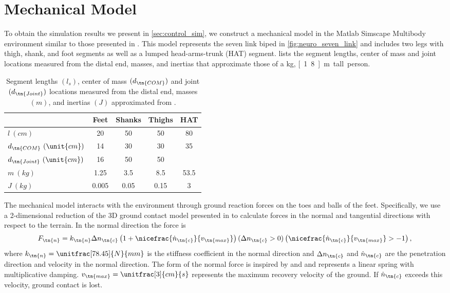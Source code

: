 \section{Mechanical Model}\label{sec:neuro_mech_model}

To obtain the simulation results we present in \cref{sec:control_sim}, we
construct a mechanical model in the Matlab Simscape Multibody environment
similar to those presented in \citet{geyer2010muscle, song2013integration,
song2015neural}. This model represents the seven link biped in
\cref{fig:neuro_seven_link} and includes two legs with thigh, shank, and foot
segments as well as a lumped head-arms-trunk (HAT) segment.
 lists the segment lengths, center of mass and joint
locations measured from the distal end, masses, and inertias that approximate
those of a \unit[80]{kg}, \unit[1.8]{m} tall person.

\begin{table}[b]
  \centering
      \begin{tabular}{lcccc}
        \toprule
        & Feet & Shanks & Thighs & HAT \\
        \midrule
        $l         \ (\unit{cm})$ & 20    & 50   & 50   & 80   \\
        $d_\tn{COM}   \ (\unit{cm})$ & 14    & 30   & 30   & 35   \\
        $d_\tn{Joint} \ (\unit{cm})$ & 16    & 50   & 50   &      \\
        $m         \ (\unit{kg})$ & 1.25  & 3.5  & 8.5  & 53.5 \\
        $J         \ (\unit{kg})$ & 0.005 & 0.05 & 0.15 & 3    \\
        \bottomrule
      \end{tabular}
  \caption{Segment lengths $(l_s)$, center of mass $(d_\tn{COM})$ and joint
  $(d_\tn{Joint})$ locations measured from the distal end, masses $(m)$, and
  inertias $(J)$ approximated from
  \citet{gunther2003synthesis}.}\label{tab:model_mech_params}
\end{table}

The mechanical model interacts with the environment through ground reaction
forces on the toes and balls of the feet. Specifically, we use a 2-dimensional
reduction of the 3D ground contact model presented in
\citet{song2013generalization} to calculate forces in the normal and
tangential directions with respect to the terrain. In the normal direction the
force is
\begin{align}
    F_\tn{n} = k_\tn{n} \Delta n_\tn{c} 
    \left(1 + \nicefrac{\dot n_\tn{c}}{v_\tn{max}} \right)(\Delta n_\tn{c} > 0)
    \left(\nicefrac{\dot n_\tn{c}}{v_\tn{max}} > -1 \right),
    \label{eq:grf_n}
\end{align}
where $k_\tn{n} = \unitfrac[78.45]{N}{mm}$ is the stiffness coefficient in the
normal direction and $\Delta n_\tn{c}$ and $\dot n_\tn{c}$ are the penetration
direction and velocity in the normal direction. The form of the normal force is
inspired by \citet{gunther2003synthesis} and \citet{scott1993biomechanical} and
represents a linear spring with multiplicative damping.  $v_\tn{max} =
\unitfrac[3]{cm}{s}$ represents the maximum recovery velocity of the ground. If
$\dot n_\tn{c}$ exceeds this velocity, ground contact is lost.

